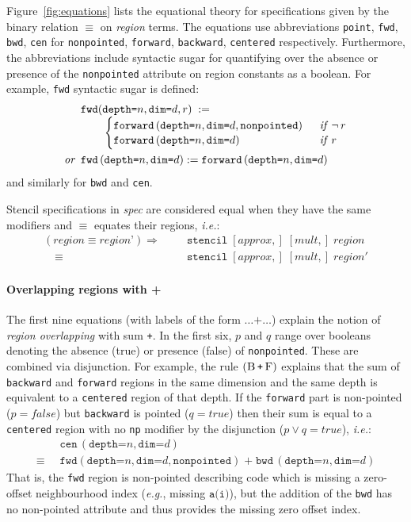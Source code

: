 \documentclass[10pt,preprint]{sigplanconf}
\theoremstyle{definition}
\newcommand{\ie}{\emph{i.e.}}
\newcommand{\eg}{\emph{e.g.}}
\newcommand{\term}[1]{\texttt{#1}}
\newcommand{\stenFwd}[3]{\term{forward} \, (\term{depth=}#1,
  \term{dim=}#2{#3})}
\newcommand{\irrefl}{\texttt{nonpointed}}
\newcommand{\stenFwdS}[2]{\term{fwd} \, (\term{depth=}#1,
  \term{dim=}#2)}
\newcommand{\stenBwdS}[2]{\term{bwd} \, (\term{depth=}#1,
  \term{dim=}#2)}
\newcommand{\stenCenS}[2]{\term{cen} \, (\term{depth=}#1,
  \term{dim=}#2)}
\newcommand{\irreflS}{\texttt{np}}
\newcommand{\stenFwdSR}[3]{\term{fwd} (\term{depth=}#1,
  \term{dim=}#2, #3)}
\begin{document}
Figure~\ref{fig:equations} lists the equational theory for
specifications given by the binary relation $\equiv$
on \emph{region} terms. The equations use abbreviations
\term{point}, \term{fwd}, \term{bwd}, \term{cen}
for \term{nonpointed}, \term{forward}, \term{backward},
\term{centered} respectively. Furthermore, the abbreviations include syntactic sugar
for quantifying over the absence or presence of the \irrefl{}
attribute on region constants as a boolean. For example,
\term{fwd} syntactic sugar is defined:
\begin{align*}
\hspace{-0.25em}
& \stenFwdSR{n}{d}{r}
\; := \; \\[-0.4em]
& \qquad \begin{cases}
\stenFwd{n}{d}{, \irrefl} & \;\;\textit{if} \;\, \neg \, r \\[-0.1em]
\stenFwd{n}{d}{}  & \;\;\textit{if} \;\,  r
\end{cases} \\
\textit{or} \;\;
& \stenFwdS{n}{d} := \stenFwd{n}{d}{}
\end{align*}
%
and similarly for \term{bwd} and \term{cen}.

Stencil specifications in \textit{spec} are considered
equal when they have the same modifiers and $\equiv$ equates
their regions, \ie{}:
\begin{align*}
(\textit{region} \equiv \textit{region'})
 \Rightarrow \quad\;\; & \texttt{stencil} \; [\textit{approx},] \; [\textit{mult},] \;
\textit{region} \\[-0.4em]
\quad \equiv \; & \texttt{stencil} \; [\textit{approx},] \;
            [\textit{mult},] \; \textit{region}'
\end{align*}
%

\paragraph{Overlapping regions with +}
The first nine
equations (with labels of the form $\ldots \texttt{+} \ldots$)
explain the notion of \emph{region overlapping} with sum
\term{+}. In the first six, $p$ and $q$ range
over booleans denoting the absence (true) or presence (false)
of \irrefl{}. These are combined via disjunction. For example,
the rule $(\textsc{B} \, \term{+} \,
\textsc{F})$ explains that the sum of \term{backward}
and \term{forward} regions in the same dimension and the same
depth is equivalent to a \term{centered} region of that depth.
If the \term{forward} part is non-pointed ($p =
\textit{false}$) but \term{backward} is pointed ($q =
\textit{true}$) then their sum is equal to a \term{centered}
region with no \irreflS{} modifier by the disjunction ($p \vee q =
\textit{true}$), \ie{}:
\begin{align*}
& \stenCenS{n}{d}  \\[-0.2em]
\equiv \;\; & \stenFwdSR{n}{d}{\irrefl} \; \texttt{+} \; \stenBwdS{n}{d}
\end{align*}
That is, the \term{fwd} region is non-pointed describing code which is missing
a zero-offset neighbourhood index (\eg{}, missing $\texttt{a(i)}$), but the addition of
the \term{bwd} has no non-pointed attribute and thus provides the
missing zero offset index.
\end{document}
